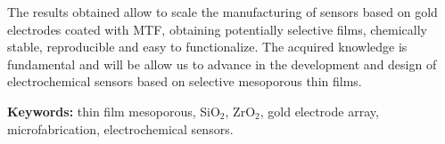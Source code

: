 The results obtained allow to scale the manufacturing of sensors based on gold electrodes coated with MTF, obtaining potentially selective films, chemically stable, reproducible and easy to functionalize. The acquired knowledge is fundamental and will be allow us to advance in the development and design of electrochemical sensors based on selective mesoporous thin films.
\vspace*{\fill}

\vfill

\noindent\textbf{Keywords:} thin film mesoporous, SiO$_2$, ZrO$_2$, gold electrode array, microfabrication, electrochemical sensors.

\cleardoublepage

